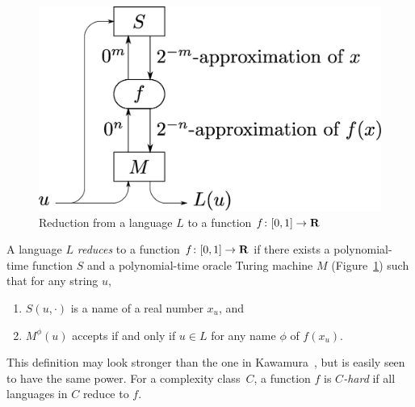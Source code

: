  \begin{figure}[tb]
  \begin{center}
  \includegraphics[scale=0.20]{image/reduction.eps}
  \caption{Reduction from a language $L$ to a function $f \colon [0,1] \to \mathbf R$}
  \label{fig:reduction}
  \end{center}
 \end{figure}

\begin{definition}
 A language $L$ \emph{reduces} to a function $f \colon [0, 1] \to \mathbf R$
 if there exists a polynomial-time function $S$ and a polynomial-time oracle Turing machine $M$ (Figure~\ref{fig:reduction})
 such that for any string $u$, 
  \begin{enumerate}
   \item $S(u, \cdot)$ is a name of a real number $x_u$, and 
   \item $M^\phi(u)$ accepts if and only if $u \in L$ for any name $\phi$ of $f(x_u)$.
  \end{enumerate}
\end{definition}
This definition may look stronger than
the one in Kawamura~\cite{kawamura2010lipschitz}, 
but is easily seen to have the same power.
For a complexity class~$C$, a function $f$ is \emph{$C$-hard}
if all languages in $C$ reduce to $f$.
